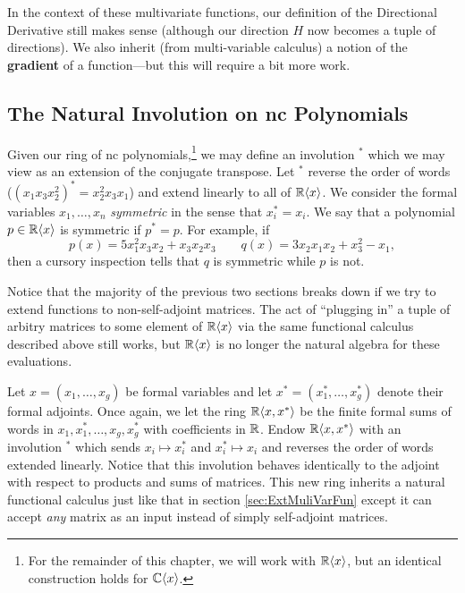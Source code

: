 In the context of these multivariate functions, our definition of the
Directional Derivative still makes sense (although our direction \(H\) now
becomes a tuple of directions). We also inherit (from multi-variable calculus) a
notion of the \textbf{gradient} of a function---but this will require a bit more work.

\subsection{The Natural Involution on nc Polynomials}%
\label{ssec:NatInvo}

Given our ring of nc polynomials,\footnote{For the remainder of this chapter,
  we will work with \(\mathbb{R} \langle x \rangle \), but an identical construction
  holds for \(\mathbb{C} \langle x \rangle \).}
we may define an involution \(^*\) which we
may view as an extension of the conjugate transpose. Let \(^*\) reverse the
order of words (\ie \((x_1x_3x_2^2)^* = x_2^2x_3x_1\)) and extend linearly to
all of \(\mathbb{R} \langle x \rangle \). We consider the formal
variables \(x_1, \dots , x_n\) \emph{symmetric} in the sense that
\(x_i^* = x_i\). We say that a polynomial \(p \in \mathbb{R} \langle x \rangle \) is
symmetric if \(p^* = p\). For example, if
\[
  p(x) = 5x_1^2x_3x_2 + x_3x_2x_3 \qquad q(x) = 3x_2x_1x_2 + x_3^2 - x_1 ,
\]
then a cursory inspection tells that \(q\) is symmetric while \(p\) is not.

Notice that the majority of the previous two sections breaks down if we try to
extend functions to non-self-adjoint matrices. The act of ``plugging in''
a tuple of arbitry matrices to some element of \(\mathbb{R} \langle x \rangle \) via the same
functional calculus described above still works, but \(\mathbb{R} \langle x \rangle \)
is no longer the natural algebra for these evaluations.

Let \(x = (x_1, \dots, x_g)\) be formal variables and let
\(x^* = (x_1^*, \dots, x_g^*)\) denote their formal adjoints. Once again, we let
the ring \(\mathbb{R} \langle x,x^* \rangle \) be the finite formal sums of words in
\(x_1,x_1^*, \dots , x_g,x_g^*\) with coefficients in \(\mathbb{R} \). Endow
\(\mathbb{R} \langle x,x^* \rangle \) with an involution \(^*\) which sends
\(x_i \mapsto x_i^*\) and \(x_i^* \mapsto x_i\) and reverses the order of words
extended linearly. Notice that this involution behaves identically to the
adjoint with respect to products and sums of matrices. This new ring inherits a
natural functional calculus just like that in section \ref{sec:ExtMuliVarFun}
except it can accept \emph{any} matrix as an input instead of simply
self-adjoint matrices.

